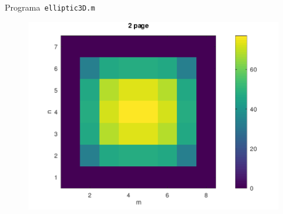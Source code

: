 \begin{listing}[ht!]
      \tiny
      \centering
      \inputminted[frame=single,framesep=10pt,linenos,firstline=1,lastline=38,highlightlines={14,15}]{octave}{../examples/octave/elliptic3D.m}
      \caption{Programa~\texttt{elliptic3D.m}}
      \label{code:elliptic3D.m}
\end{listing}

\begin{figure}[ht!]
      \centering
      \includegraphics[width=.6\paperwidth]{../examples/octave/elliptic3D.pdf}
\end{figure}